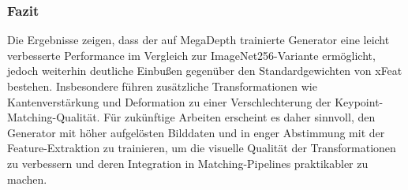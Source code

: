 \newpage



\subsubsection*{Fazit}
Die Ergebnisse zeigen, dass der auf MegaDepth trainierte Generator eine leicht verbesserte Performance im Vergleich zur ImageNet256-Variante ermöglicht, jedoch weiterhin deutliche Einbußen gegenüber den Standardgewichten von \ac{xFeat} bestehen. 
Insbesondere führen zusätzliche Transformationen wie Kantenverstärkung und Deformation zu einer Verschlechterung der Keypoint-Matching-Qualität. 
Für zukünftige Arbeiten erscheint es daher sinnvoll, den Generator mit höher aufgelösten Bilddaten und in enger Abstimmung mit der Feature-Extraktion zu trainieren, um die visuelle Qualität der Transformationen zu verbessern und deren Integration in Matching-Pipelines praktikabler zu machen.